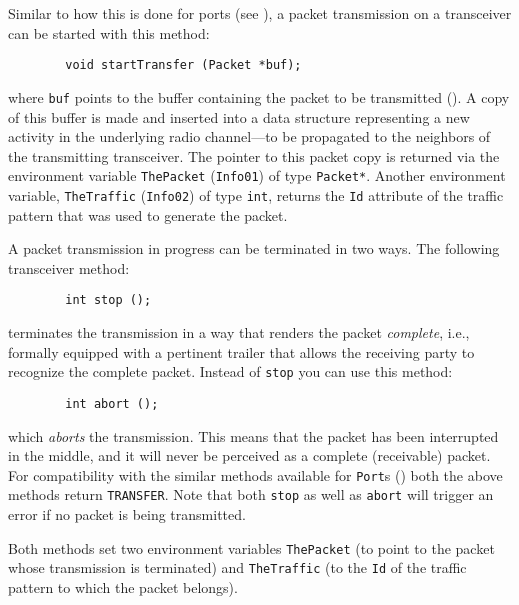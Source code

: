 Similar to how this is done for ports (see ),
a packet transmission on a transceiver can be started with this 
method:
\begin{verbatim}
        void startTransfer (Packet *buf);
\end{verbatim}
where {\tt buf} points to the buffer
containing the packet to be transmitted ().
A copy of this buffer is made and inserted into a data structure representing
a new activity in the underlying radio channel---to be propagated to the
neighbors of the transmitting transceiver.
The pointer to this packet copy is returned via the environment
variable {\tt ThePacket} ({\tt Info01}) of type {\tt Packet*}.
Another environment variable, {\tt TheTraffic} ({\tt Info02}) of type
{\tt int}, returns the {\tt Id} attribute of the traffic pattern that was
used to generate the packet.

A packet transmission in progress can be terminated in two ways.
The following transceiver method:
\begin{verbatim}
        int stop ();
\end{verbatim}
\noindent
terminates the transmission in a way that renders the
packet {\em complete}, i.e., formally
equipped with a pertinent trailer that allows the receiving party to
recognize the complete packet.
Instead of {\tt stop} you can use this method:
\begin{verbatim}
        int abort ();
\end{verbatim}
which {\em aborts\/} the transmission.
This means that the packet has been interrupted in the middle,
and it will never be perceived as a complete (receivable) packet.
For compatibility with the similar methods available for {\tt Port}s
() both the above methods return {\tt TRANSFER}.
Note that both {\tt stop} as well as {\tt abort} will trigger an error
if no packet is being transmitted.

Both methods set two environment variables {\tt ThePacket}
(to point to the packet whose transmission is terminated)
and {\tt TheTraffic} (to the
{\tt Id} of the traffic pattern to which the packet belongs).

\medskip

